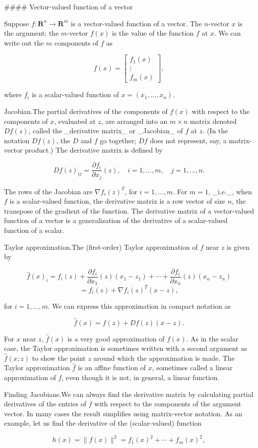 

#### Vector-valued function of a vector

Suppose \(f:\mathbf{R}^{n}\to\mathbf{R}^{m}\) is a vector-valued function of a vector. The \(n\)-vector \(x\) is the argument; the \(m\)-vector \(f(x)\) is the value of the function \(f\) at \(x\). We can write out the \(m\) components of \(f\) as

\[f(x)=\left[\begin{array}{c}f_{1}(x)\\ \vdots\\ f_{m}(x)\end{array}\right],\]

where \(f_{i}\) is a scalar-valued function of \(x=(x_{1},\ldots,x_{n})\).

Jacobian.The partial derivatives of the components of \(f(x)\) with respect to the components of \(x\), evaluated at \(z\), are arranged into an \(m\times n\) matrix denoted \(Df(z)\), called the _derivative matrix_ or _Jacobian_ of \(f\) at \(z\). (In the notation \(Df(z)\), the \(D\) and \(f\) go together; \(Df\) does not represent, say, a matrix-vector product.) The derivative matrix is defined by

\[Df(z)_{ij}=\frac{\partial f_{i}}{\partial x_{j}}(z),\quad i=1,\ldots,m,\quad j =1,\ldots,n.\]

The rows of the Jacobian are \(\nabla f_{i}(z)^{T}\), for \(i=1,\ldots,m\). For \(m=1\), _i.e._, when \(f\) is a scalar-valued function, the derivative matrix is a row vector of size \(n\), the transpose of the gradient of the function. The derivative matrix of a vector-valued function of a vector is a generalization of the derivative of a scalar-valued function of a scalar.

Taylor approximation.The (first-order) Taylor approximation of \(f\) near \(z\) is given by

\[\hat{f}(x)_{i} = f_{i}(z)+\frac{\partial f_{i}}{\partial x_{1}}(z)(x_{1}-z_{1})+ \cdots+\frac{\partial f_{i}}{\partial x_{n}}(z)(x_{n}-z_{n})\] \[= f_{i}(z)+\nabla f_{i}(z)^{T}(x-z),\]

for \(i=1,\ldots,m\). We can express this approximation in compact notation as

\[\hat{f}(x)=f(z)+Df(z)(x-z).\]

For \(x\) near \(z\), \(\hat{f}(x)\) is a very good approximation of \(f(x)\). As in the scalar case, the Taylor approximation is sometimes written with a second argument as \(\hat{f}(x;z)\) to show the point \(z\) around which the approximation is made. The Taylor approximation \(\hat{f}\) is an affine function of \(x\), sometimes called a linear approximation of \(f\), even though it is not, in general, a linear function.

Finding Jacobians.We can always find the derivative matrix by calculating partial derivatives of the entries of \(f\) with respect to the components of the argument vector. In many cases the result simplifies using matrix-vector notation. As an example, let us find the derivative of the (scalar-valued) function

\[h(x)=\|f(x)\|^{2}=f_{1}(x)^{2}+\cdots+f_{m}(x)^{2},\]